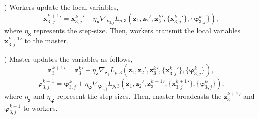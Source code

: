 \documentclass[letterpaper]{article}
\begin{document}
) Workers update the local variables,
\begin{equation}
{\boldsymbol{x}_{3,j}^{k+1}}' \!=\! {\boldsymbol{x}_{3,j}^{k}}'\!-\!\eta_{\boldsymbol{x}} \!\nabla_{\boldsymbol{x}_{3,j}} L_{p,3}({\boldsymbol{z}_1},{\boldsymbol{z}_2}'\!, {\boldsymbol{z}_3^k}',\! \{{\boldsymbol{x}_{3,j}^k}'\},\! \{\boldsymbol{\varphi}_{3,j}^k\}),
\end{equation}
where $\eta_{\boldsymbol{x}}$ represents the step-size. Then, workers transmit the local variables ${\boldsymbol{x}_{3,j}^{k+1}}'$ to the master.

) Master updates the variables as follows,
\begin{equation}
{\boldsymbol{z}_3^{k+1}}' \!=\! {\boldsymbol{z}_3^k}' \!-\! \eta_{\boldsymbol{z}}\! \nabla_{\boldsymbol{z}_3} L_{p,3}({\boldsymbol{z}_1},{\boldsymbol{z}_2}' \!, {\boldsymbol{z}_3^k}', \! \{{\boldsymbol{x}_{3,j}^k}'\}, \! \{\boldsymbol{\varphi}_{3,j}^k\}),
\end{equation}
\begin{equation}
\boldsymbol{\varphi}_{3,j}^{k+1} \!=\! \boldsymbol{\varphi}_{3,j}^{k}+\eta_{\boldsymbol{\varphi}}\! \nabla_{\boldsymbol{\varphi}_{3,j}} L_{p,3}({\boldsymbol{z}_1},{\boldsymbol{z}_2}' \!, {\boldsymbol{z}_3^{k+1}}', \! \{{\boldsymbol{x}_{3,j}^{k+1}}'\}, \! \{\boldsymbol{\varphi}_{3,j}^k\}),
\end{equation}
where $\eta_{\boldsymbol{z}}$ and $\eta_{\boldsymbol{\varphi}}$ represent the step-sizes. Then, master broadcasts the ${\boldsymbol{z}_3^{k+1}}'$ and $\boldsymbol{\varphi}_{3,j}^{k+1}$ to workers.
\end{document}
